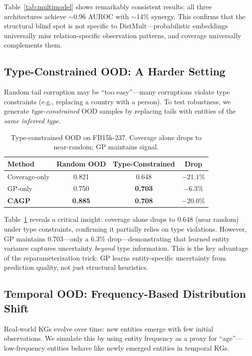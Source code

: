 Table~\ref{tab:multimodel} shows remarkably consistent results: all three architectures achieve $\sim$0.96 AUROC with $\sim$14\% synergy.
This confirms that the structural blind spot is not specific to DistMult---probabilistic embeddings universally miss relation-specific observation patterns, and coverage universally complements them.

\subsection{Type-Constrained OOD: A Harder Setting}

Random tail corruption may be ``too easy''---many corruptions violate type constraints (e.g., replacing a country with a person).
To test robustness, we generate \emph{type-constrained} OOD samples by replacing tails with entities of the \emph{same inferred type}.

\begin{table}[t]
\centering
\caption{Type-constrained OOD on FB15k-237. Coverage alone drops to near-random; GP maintains signal.}
\label{tab:typeood}
\vspace{0.5em}
\begin{tabular}{lccc}
\toprule
Method & Random OOD & Type-Constrained & Drop \\
\midrule
Coverage-only & 0.821 & 0.648 & $-21.1\%$ \\
GP-only & 0.750 & \textbf{0.703} & $-6.3\%$ \\
\textbf{CAGP} & \textbf{0.885} & \textbf{0.708} & $-20.0\%$ \\
\bottomrule
\end{tabular}
\end{table}

Table~\ref{tab:typeood} reveals a critical insight: coverage alone drops to 0.648 (near random) under type constraints, confirming it partially relies on type violations.
However, GP maintains 0.703---only a 6.3\% drop---demonstrating that learned entity variance captures uncertainty \emph{beyond} type information.
This is the key advantage of the reparameterization trick: GP learns entity-specific uncertainty from prediction quality, not just structural heuristics.

\subsection{Temporal OOD: Frequency-Based Distribution Shift}

Real-world KGs evolve over time: new entities emerge with few initial observations.
We simulate this by using entity frequency as a proxy for ``age''---low-frequency entities behave like newly emerged entities in temporal KGs.

